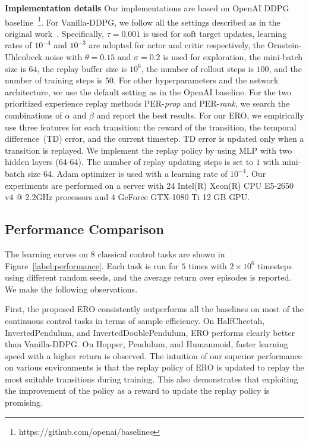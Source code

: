 \documentclass{article}
\newcommand{\paratitle}[1]{\vspace{1.5ex}\noindent \textbf{#1\quad}}
\begin{document}
\paratitle{Implementation details} Our implementations are based on OpenAI DDPG baseline~\footnote{https://github.com/openai/baselines}. For Vanilla-DDPG, we follow all the settings described as in the original work~\cite{lillicrap2016continuous}. Specifically, $\tau=0.001$ is used for soft target updates, learning rates of $10^{-4}$ and $10^{-3}$ are adopted for actor and critic respectively, the Ornstein-Uhlenbeck noise with $\theta=0.15$ and $\sigma = 0.2$ is used for exploration, the mini-batch size is $64$, the replay buffer size is $10^6$, the number of rollout steps is $100$, and the number of training steps is $50$. For other hyperparameters and the network architecture, we use the default setting as in the OpenAI baseline. For the two prioritized experience replay methods PER-\emph{prop} and PER-\emph{rank}, we search the combinations of $\alpha$ and $\beta$ and report the best results. For our ERO, we empirically use three features for each transition: the reward of the transition, the temporal difference~(TD) error, and the current timestep. TD error is updated only when a transition is replayed. We implement the replay policy by using MLP with two hidden layers (64-64). The number of replay updating steps is set to $1$ with mini-batch size 64. Adam optimizer is used with a learning rate of $10^{-4}$. Our experiments are performed on a server with 24 Intel(R) Xeon(R) CPU E5-2650 v4 @ 2.2GHz processors and 4 GeForce GTX-1080 Ti 12 GB GPU.




\subsection{Performance Comparison}
The learning curves on 8 classical control tasks are shown in Figure~\ref{label:performance}. Each task is run for $5$ times with $2 \times 10^6$ timesteps using different random seeds, and the average return over episodes is reported. We make the following observations.

First, the proposed ERO consistently outperforms all the baselines on most of the continuous control tasks in terms of sample efficiency. On HalfCheetah, InvertedPendulum, and InvertedDoublePendulum, ERO performs clearly better than Vanilla-DDPG. On Hopper, Pendulum, and Humanmoid, faster learning speed with a higher return is observed. The intuition of our superior performance on various environments is that the replay policy of ERO is updated to replay the most suitable transitions during training. This also demonstrates that exploiting the improvement of the policy as a reward to update the replay policy is promising.
\end{document}
